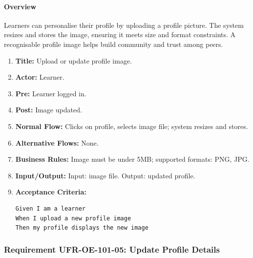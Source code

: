 \paragraph{Overview}
Learners can personalise their profile by uploading a profile picture. The system resizes and stores the image, ensuring it meets size and format constraints. A recognisable profile image helps build community and trust among peers.
\begin{enumerate}[label=\textbf{\arabic*.}]
\item \textbf{Title:} Upload or update profile image.
\item \textbf{Actor:} Learner.
\item \textbf{Pre:} Learner logged in.
\item \textbf{Post:} Image updated.
\item \textbf{Normal Flow:} Clicks on profile, selects image file; system resizes and stores.
\item \textbf{Alternative Flows:} None.
\item \textbf{Business Rules:} Image must be under 5MB; supported formats: PNG, JPG.
\item \textbf{Input/Output:} Input: image file. Output: updated profile.
\item \textbf{Acceptance Criteria:}
    \begin{verbatim}
Given I am a learner
When I upload a new profile image
Then my profile displays the new image
    \end{verbatim}
\end{enumerate}

\subsubsection{Requirement UFR-OE-101-05: Update Profile Details}
